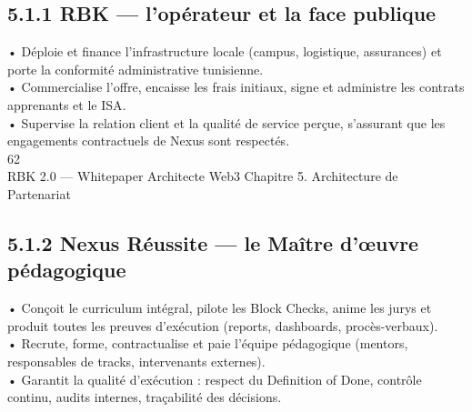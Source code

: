 \documentclass[12pt,landscape,a4paper]{article}
\begin{document}
\subsection{5.1.1 RBK — l’opérateur et la face publique}
• Déploie et finance l’infrastructure locale (campus, logistique, assurances) et porte la conformité administrative tunisienne.\\
• Commercialise l’offre, encaisse les frais initiaux, signe et administre les contrats apprenants et le ISA.\\
• Supervise la relation client et la qualité de service perçue, s’assurant que les engagements contractuels de Nexus sont respectés.\\
\vspace{0.5em}
\vspace{0.5em}
\vspace{0.5em}
\vspace{0.5em}
62\\
RBK 2.0 — Whitepaper Architecte Web3                                                                                          Chapitre 5. Architecture de Partenariat\\
\vspace{0.5em}
\vspace{0.5em}
\subsection{5.1.2 Nexus Réussite — le Maître d’œuvre pédagogique}
• Conçoit le curriculum intégral, pilote les Block Checks, anime les jurys et produit toutes les preuves d’exécution (reports, dashboards, procès-verbaux).\\
• Recrute, forme, contractualise et paie l’équipe pédagogique (mentors, responsables de tracks, intervenants externes).\\
• Garantit la qualité d’exécution : respect du Definition of Done, contrôle continu, audits internes, traçabilité des décisions.\\
\vspace{0.5em}
\vspace{0.5em}
\end{document}

